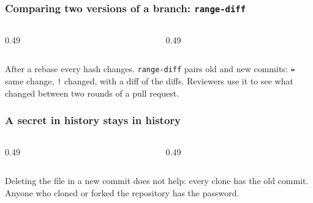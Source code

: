 \documentclass[aspectratio=169,10pt,compress]{beamer}
\begin{document}
\begin{frame}[t,fragile] \frametitle{Comparing two versions of a branch: \texttt{range-diff}}
  \begin{columns}[T]
    \begin{column}{0.49\textwidth}
    \end{column}
    \begin{column}{0.49\textwidth}
    \end{column}
  \end{columns}

  \vspace{0.1em}
  \small
  After a rebase every hash changes. \texttt{range-diff} pairs old and new commits: \texttt{=} same change, \texttt{!} changed, with a diff of the diffs.
  Reviewers use it to see what changed between two rounds of a pull request.
\end{frame}





\begin{frame}[t,fragile] \frametitle{A secret in history stays in history}
  \begin{columns}[T]
    \begin{column}{0.49\textwidth}
    \end{column}
    \begin{column}{0.49\textwidth}
    \end{column}
  \end{columns}

  \vspace{0.1em}
  \small
  Deleting the file in a new commit does not help: every clone has the old commit. Anyone who cloned or forked the repository has the password.
\end{frame}
\end{document}
